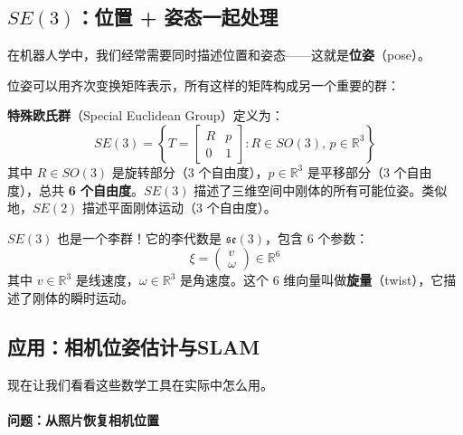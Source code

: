 \subsection*{$SE(3)$：位置 + 姿态一起处理}

在机器人学中，我们经常需要同时描述位置和姿态——这就是\textbf{位姿}（pose）。

位姿可以用齐次变换矩阵表示，所有这样的矩阵构成另一个重要的群：

\begin{definition}[特殊欧氏群 $SE(3)$]
\textbf{特殊欧氏群}（Special Euclidean Group）定义为：
\begin{equation}
SE(3) = \left\{ T = \begin{bmatrix} R & p \\ 0 & 1 \end{bmatrix} : R \in SO(3), \, p \in \mathbb{R}^3 \right\}
\end{equation}
其中 $R \in SO(3)$ 是旋转部分（3 个自由度），$p \in \mathbb{R}^3$ 是平移部分（3 个自由度），总共 \textbf{6 个自由度}。$SE(3)$ 描述了三维空间中刚体的所有可能位姿。类似地，$SE(2)$ 描述平面刚体运动（3 个自由度）。
\end{definition}

$SE(3)$ 也是一个李群！它的李代数是 $\mathfrak{se}(3)$，包含 6 个参数：
\begin{equation}
\xi = \begin{pmatrix} v \\ \omega \end{pmatrix} \in \mathbb{R}^6
\end{equation}
其中 $v \in \mathbb{R}^3$ 是线速度，$\omega \in \mathbb{R}^3$ 是角速度。这个 6 维向量叫做\textbf{旋量}（twist），它描述了刚体的瞬时运动。

\subsection*{应用：相机位姿估计与SLAM}

现在让我们看看这些数学工具在实际中怎么用。

\paragraph{问题：从照片恢复相机位置}

